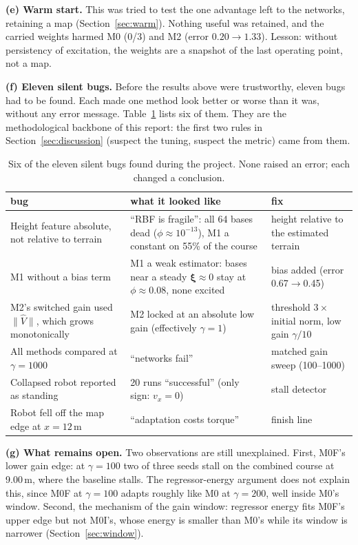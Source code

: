 \documentclass[conference]{IEEEtran}
\begin{document}
\textbf{(e) Warm start.} This was tried to test the one advantage left
to the networks, retaining a map (Section~\ref{sec:warm}). Nothing
useful was retained, and the carried weights harmed M0 (0/3) and M2
(error $0.20\to1.33$). Lesson: without persistency of excitation, the
weights are a snapshot of the last operating point, not a map.

\textbf{(f) Eleven silent bugs.} Before the results above were
trustworthy, eleven bugs had to be found. Each made one method look
better or worse than it was, without any error message.
Table~\ref{tab:bugs} lists six of them. They are the methodological
backbone of this report: the first two rules in
Section~\ref{sec:discussion} (suspect the tuning, suspect the metric)
came from them.

\begin{table}[t]
\centering
\caption{Six of the eleven silent bugs found during the project. None
raised an error; each changed a conclusion.}
\label{tab:bugs}
\renewcommand{\arraystretch}{1.12}
\setlength{\tabcolsep}{3pt}
\begin{tabular}{>{\raggedright}p{2.45cm}>{\raggedright}p{3.0cm}>{\raggedright\arraybackslash}p{2.6cm}}
\hline
bug & what it looked like & fix\\
\hline
Height feature absolute, not relative to terrain & ``RBF is fragile'': all 64 bases dead ($\phi\approx10^{-13}$), M1 a constant on 55\% of the course & height relative to the estimated terrain\\
M1 without a bias term & M1 a weak estimator: bases near a steady $\bm\xi\approx0$ stay at $\phi\approx0.08$, none excited & bias added (error 0.67$\to$0.45)\\
M2's switched gain used $\|\hat V\|$, which grows monotonically & M2 locked at an absolute low gain (effectively $\gamma=1$) & threshold $3\times$ initial norm, low gain $\gamma/10$\\
All methods compared at $\gamma=1000$ & ``networks fail'' & matched gain sweep (100--1000)\\
Collapsed robot reported as standing & 20 runs ``successful'' (only sign: $v_x=0$) & stall detector\\
Robot fell off the map edge at $x=12$\,m & ``adaptation costs torque'' & finish line\\
\hline
\end{tabular}
\end{table}

\textbf{(g) What remains open.} Two observations are still unexplained.
First, M0F's lower gain edge: at $\gamma=100$ two of three seeds stall
on the combined course at 9.00\,m, where the baseline stalls. The
regressor-energy argument does not explain this, since M0F at
$\gamma=100$ adapts roughly like M0 at $\gamma=200$, well inside M0's
window. Second, the mechanism of the gain window: regressor energy fits
M0F's upper edge but not M0I's, whose energy is smaller than M0's while
its window is narrower (Section~\ref{sec:window}).
\end{document}
